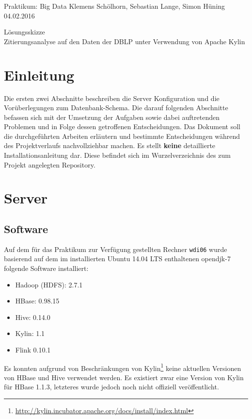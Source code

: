 \documentclass[a4paper,11pt,utf8]{scrartcl}
\begin{document}
\pagestyle{empty}

\noindent
Praktikum: Big Data \hfill Klemens Schölhorn, Sebastian Lange, Simon Hüning \hfill 04.02.2016\vspace{-.4cm}\\
\begin{center}
\huge\textsf{Lösungsskizze}\vspace{.1cm}\\
\large Zitierungsanalyse auf den Daten der DBLP unter Verwendung von Apache Kylin
\end{center}

\section*{Einleitung}

Die ersten zwei Abschnitte beschreiben die Server Konfiguration und die Vorüberlegungen zum Datenbank-Schema. Die darauf folgenden Abschnitte befassen sich mit der Umsetzung der Aufgaben sowie dabei auftretenden Problemen und in Folge dessen getroffenen Entscheidungen. Das Dokument soll die durchgeführten Arbeiten erläutern und bestimmte Entscheidungen während des Projektverlaufs nachvollziehbar machen. Es stellt \textbf{keine} detaillierte Installationsanleitung dar. Diese befindet sich im Wurzelverzeichnis des zum Projekt angelegten Repository.


\section{Server}

\subsection{Software}

Auf dem für das Praktikum zur Verfügung gestellten Rechner \texttt{wdi06} wurde basierend auf dem im installierten Ubuntu 14.04 LTS enthaltenen opendjk-7 folgende Software installiert:

\begin{itemize}
    \item Hadoop (HDFS): 2.7.1
    \item HBase: 0.98.15
    \item Hive: 0.14.0
    \item Kylin: 1.1
    \item Flink 0.10.1
\end{itemize}

\noindent
Es konnten aufgrund von Beschränkungen von Kylin\footnote{\url{http://kylin.incubator.apache.org/docs/install/index.html}} keine aktuellen Versionen von HBase und Hive verwendet werden. Es existiert zwar eine Version von Kylin für HBase 1.1.3, letzteres wurde jedoch noch nicht offiziell veröffentlicht.
\end{document}
